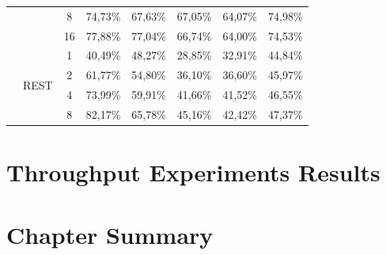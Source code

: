 \begin{table}[]
{\begin{tabular}{|c|c|c|c|c|c|c|c|}
			&  & 8 & 74,73\% & 67,63\% & 67,05\% & 64,07\% & 74,98\% \\ \cline{3-8} 
			&  & 16 & 77,88\% & 77,04\% & 66,74\% & 64,00\% & 74,53\% \\ \cline{2-8} 
			& \multirow{4}{*}{REST} & 1 & 40,49\% & 48,27\% & 28,85\% & 32,91\% & 44,84\% \\ \cline{3-8} 
			&  & 2 & 61,77\% & 54,80\% & 36,10\% & 36,60\% & 45,97\% \\ \cline{3-8} 
			&  & 4 & 73,99\% & 59,91\% & 41,66\% & 41,52\% & 46,55\% \\ \cline{3-8} 
			&  & 8 & 82,17\% & 65,78\% & 45,16\% & 42,42\% & 47,37\% \\ \hline
		\end{tabular}%
	}
\end{table}

\section{Throughput Experiments Results}

\section{Chapter Summary}